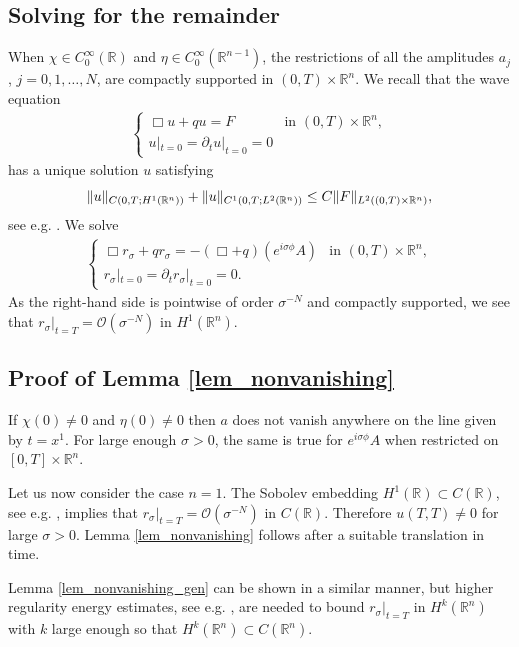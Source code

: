 \documentclass[12pt,oneside,final]{amsart}
\def\p{\partial}
\def\R{\mathbb R}
\DeclarePairedDelimiter\norm{\lVert}{\rVert}
\begin{document}
\subsection{Solving for the remainder}

When $\chi \in C_0^\infty(\R)$ and $\eta \in C_0^\infty(\R^{n-1})$, the restrictions of all the amplitudes $a_j$, $j=0,1,\dots,N$, are compactly supported in $(0,T) \times \R^n$.
We recall that the wave equation 
\begin{align*}
\begin{cases}
\Box u + q u = F & \text{in $(0,T) \times \R^n$},
\\
u|_{t=0} = \p_t u|_{t=0} = 0
\end{cases}
\end{align*}
has a unique solution $u$ satisfying 
$$
\norm{u}_{C(0,T; H^1(\R^n))} + 
\norm{u}_{C^1(0,T; L^2(\R^n))} \le C \norm{F}_{L^2((0,T) \times \R^n)},
$$
see e.g. \cite[Theorem 7.6]{Evans1998}.
We solve 
\begin{align*}
\begin{cases}
\Box r_\sigma + q r_\sigma = -(\Box + q) (e^{i\sigma \phi} A) & \text{in $(0,T) \times \R^n$},
\\
r_\sigma|_{t=0} = \p_t r_\sigma|_{t=0} = 0.
\end{cases}
\end{align*}
As the right-hand side is pointwise of order $\sigma^{-N}$ and compactly supported, we see that $r_\sigma|_{t=T} = \mathcal O(\sigma^{-N})$ in $H^1(\R^n)$.

\subsection{Proof of Lemma \ref{lem_nonvanishing}}


If $\chi(0) \ne 0$ and $\eta(0) \ne 0$ then $a$ does not vanish anywhere on the line given by $t=x^1$.
For large enough $\sigma > 0$, the same is true for $e^{i \sigma \phi} A$ when restricted on $[0,T] \times \R^n$.

Let us now consider the case $n=1$.
The Sobolev embedding $H^1(\R) \subset C(\R)$, see e.g. \cite[Theorem 8.8]{Brezis}, implies that $r_\sigma|_{t=T} = \mathcal O(\sigma^{-N})$ in $C(\R)$.
Therefore $u(T,T) \ne 0$ for large $\sigma > 0$.
Lemma \ref{lem_nonvanishing} follows after a suitable translation in time. 

Lemma \ref{lem_nonvanishing_gen} can be shown in a similar manner, but higher regularity energy estimates, see e.g. \cite[Theorem 6, p. 412]{Evans1998}, are needed to bound $r_\sigma|_{t=T}$ in $H^k(\R^n)$ with $k$ large enough so that $H^k(\R^n) \subset C(\R^n)$.
\end{document}
